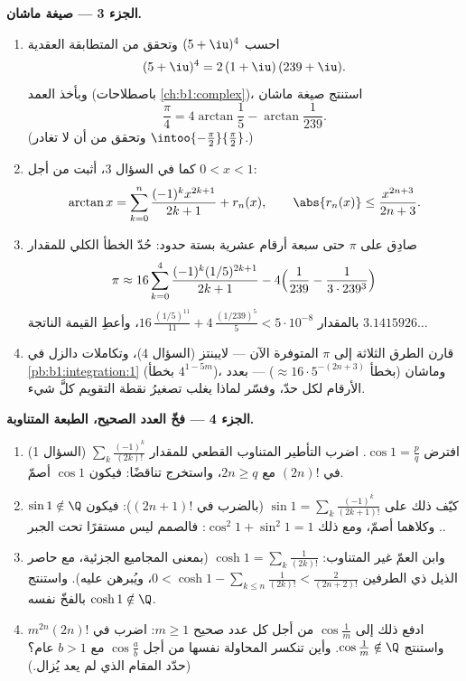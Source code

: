\begin{problem}
\medskip
\noindent\textbf{الجزء 3 --- صيغة ماشان.}
\begin{enumerate}[resume]
  \item احسب $(5 + \iu)^4$ وتحقق من المتطابقة العقدية
        \[
        (5 + \iu)^4 = 2\,(1 + \iu)\,(239 + \iu) .
        \]
        وبأخذ العمد (باصطلاحات \cref{ch:b1:complex})،
        استنتج صيغة ماشان
        \[
        \frac\pi4 = 4\arctan\frac15 - \arctan\frac{1}{239} .
        \]
        (وتحقق من أن لا  تغادر
        $\intoo{-\frac\pi2}{\frac\pi2}$.)
  \item كما في السؤال 3، أثبت من أجل $0 < x < 1$:
        \[
        \arctan x = \sum_{k=0}^{n} \frac{(-1)^k
        x^{2k+1}}{2k+1} + r_n(x), \qquad \abs{r_n(x)} \leq
        \frac{x^{2n+3}}{2n+3} .
        \]
  \item صادِق على $\pi$ حتى سبعة أرقام عشرية بستة حدود: حُدّ
        الخطأ الكلي للمقدار
        \[
        \pi \approx 16\sum_{k=0}^{4}
        \frac{(-1)^k (1/5)^{2k+1}}{2k+1}
        - 4\Bigl(\frac{1}{239} - \frac{1}{3\cdot239^3}\Bigr)
        \]
        بالمقدار $16\,\frac{(1/5)^{11}}{11} +
        4\,\frac{(1/239)^5}{5} < 5\cdot10^{-8}$، وأعطِ
        القيمة الناتجة $3.1415926\dots$
  \item قارن الطرق الثلاثة إلى $\pi$ المتوفرة الآن ---
        لايبنتز (السؤال 4)، وتكاملات دالزل في
        \cref{pb:b1:integration:1} (بخطأ $4^{1-5m}$)، وماشان
        (بخطأ $\approx 16\cdot 5^{-(2n+3)}$) --- بعدد الأرقام لكل
        حدّ، وفسّر لماذا يغلب تصغيرُ نقطة التقويم
        كلَّ شيء.
\end{enumerate}

\medskip
\noindent\textbf{الجزء 4 --- فخّ العدد الصحيح، الطبعة
المتناوبة.}
\begin{enumerate}[resume]
  \item افترض $\cos 1 = \frac pq$. اضرب التأطير المتناوب
        القطعي للمقدار $\sum_{k}
        \frac{(-1)^k}{(2k)!}$ (السؤال 1) في $(2n)!$ مع $2n
        \geq q$، واستخرج تناقضًا: فيكون $\cos 1$
        أصمّ.
  \item كيّف ذلك على $\sin 1 = \sum_k \frac{(-1)^k}{(2k+1)!}$
        (بالضرب في $(2n+1)!$): فيكون $\sin 1 \notin \Q$. وكلاهما
        أصمّ، ومع ذلك $\cos^2 1 + \sin^2 1 = 1$: فالصمم
        ليس مستقرًا تحت الجبر.
  \item وابن العمّ غير المتناوب: $\cosh 1 = \sum_k
        \frac{1}{(2k)!}$ (بمعنى المجاميع الجزئية، مع
        حاصر الذيل ذي الطرفين $0 < \cosh 1 - \sum_{k \leq n}
        \frac{1}{(2k)!} < \frac{2}{(2n+2)!}$، ويُبرهن عليه).
        واستنتج $\cosh 1 \notin \Q$ بالفخّ نفسه.
  \item ادفع ذلك إلى $\cos\frac 1m$ من أجل كل عدد صحيح $m \geq 1$:
        اضرب في $m^{2n}(2n)!$ واستنتج $\cos\frac1m
        \notin \Q$. وأين تنكسر المحاولة نفسها من أجل
        $\cos\frac ab$ مع $b > 1$ عام؟ (حدّد
        المقام الذي لم يعد يُزال.)
\end{enumerate}


\end{problem}
